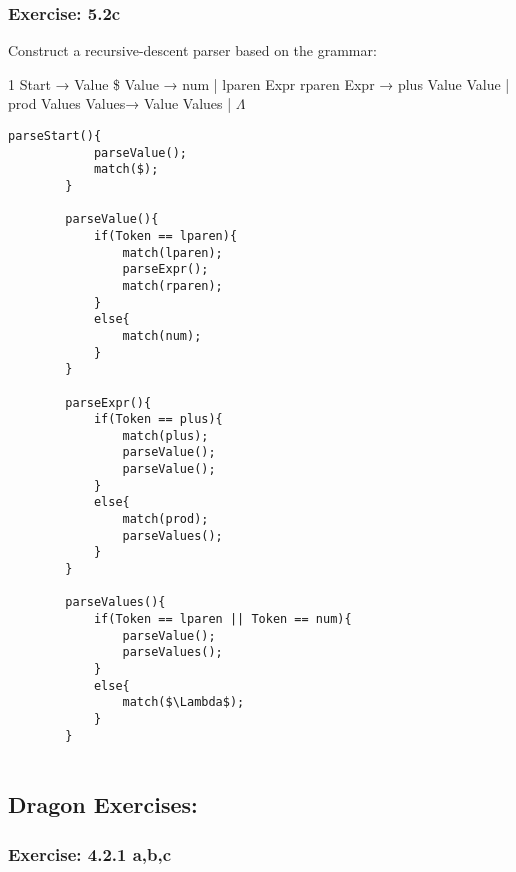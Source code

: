 \documentclass[letterpaper, 10pt,DIV=13]{scrartcl}
\numberwithin{equation}{section} %
\numberwithin{figure}{section} %
\numberwithin{table}{section} %
\begin{document}
\subsubsection*{Exercise: 5.2c}

Construct a recursive-descent parser based on the grammar: \newline

    1 Start → Value \$  Value → num        | lparen Expr rparen  Expr  → plus Value Value        | prod Values  Values→ Value Values        | $\Lambda$ \newline

    \newpage
    
    \lstset{numbers=left, numberstyle=\tiny, stepnumber=1, numbersep=5pt, basicstyle=\footnotesize\ttfamily}
    \begin{lstlisting}[frame=single, ]
        parseStart(){
            parseValue();
            match($);
        }

        parseValue(){
            if(Token == lparen){
                match(lparen);
                parseExpr();
                match(rparen);
            }
            else{
                match(num);
            }
        }

        parseExpr(){
            if(Token == plus){
                match(plus);
                parseValue();
                parseValue();
            }
            else{
                match(prod);
                parseValues();
            }
        }

        parseValues(){
            if(Token == lparen || Token == num){
                parseValue();
                parseValues();
            }
            else{
                match($\Lambda$);
            }
        }
    
    \end{lstlisting}


\subsection*{Dragon Exercises:}

\subsubsection*{Exercise: 4.2.1 a,b,c}
\end{document}
